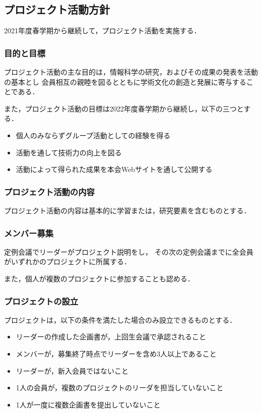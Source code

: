 \subsection*{プロジェクト活動方針}

2021年度春学期から継続して，プロジェクト活動を実施する．

\subsubsection*{目的と目標}
プロジェクト活動の主な目的は，情報科学の研究，およびその成果の発表を活動の基本とし
会員相互の親睦を図るとともに学術文化の創造と発展に寄与することである．

また，プロジェクト活動の目標は2022年度春学期から継続し，以下の三つとする．

\begin{itemize}
  \item 個人のみならずグループ活動としての経験を得る
  \item 活動を通して技術力の向上を図る
  \item 活動によって得られた成果を本会Webサイトを通して公開する
\end{itemize}

\subsubsection*{プロジェクト活動の内容}
プロジェクト活動の内容は基本的に学習または，研究要素を含むものとする．

\subsubsection*{メンバー募集}
定例会議でリーダーがプロジェクト説明をし，
その次の定例会議までに全会員がいずれかのプロジェクトに所属する．

また，個人が複数のプロジェクトに参加することも認める．

\subsubsection*{プロジェクトの設立}
プロジェクトは，以下の条件を満たした場合のみ設立できるものとする．

\begin{itemize}
  \item リーダーの作成した企画書が，上回生会議で承認されること
  \item メンバーが，募集終了時点でリーダーを含め3人以上であること
  \item リーダーが，新入会員ではないこと
  \item 1人の会員が，複数のプロジェクトのリーダを担当していないこと
  \item 1人が一度に複数企画書を提出していないこと
\end{itemize}

